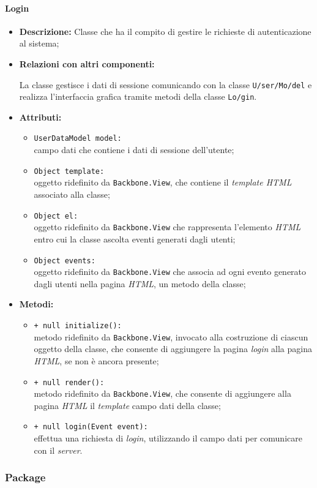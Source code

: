\paragraph{Login}
\label{login}
\begin{flushleft}
\begin{itemize}
\item \textbf{Descrizione:} Classe che ha il compito di gestire le richieste di autenticazione al sistema;
\item \textbf{Relazioni con altri componenti:}
\begin{sloppypar}
La classe gestisce i dati di sessione comunicando con la classe \texttt{\model{}U\fshyp{}ser\fshyp{}Mo\fshyp{}del} e realizza l'interfaccia grafica tramite metodi della classe \texttt{\view{}Lo\fshyp{}gin}.
\end{sloppypar}
\item \textbf{Attributi:}
\begin{sloppypar}
\begin{itemize}
\item \texttt{UserDataModel model:}\\ campo dati che contiene i dati di sessione dell'utente;
\item \texttt{Object template:}\\ oggetto ridefinito da \texttt{Backbone.View}, che contiene il \textit{template HTML} associato alla classe;
\item \texttt{Object el:}\\ oggetto ridefinito da \texttt{Backbone.View} che rappresenta l'elemento \textit{HTML} entro cui la classe ascolta eventi generati dagli utenti;
\item \texttt{Object events:}\\ oggetto ridefinito da \texttt{Backbone.View} che associa ad ogni evento generato dagli utenti nella pagina \textit{HTML}, un metodo della classe;
\end{itemize}
\end{sloppypar}
\item \textbf{Metodi:}
\begin{sloppypar}
\begin{itemize}
\item \texttt{+ null initialize():}\\ metodo ridefinito da \texttt{Backbone.View}, invocato alla costruzione di ciascun oggetto della classe, che consente di aggiungere la pagina \textit{login} alla pagina \textit{HTML}, se non è ancora presente;
\item \texttt{+ null render():}\\ metodo ridefinito da \texttt{Backbone.View}, che consente di aggiungere alla pagina \textit{HTML} il \textit{template} campo dati della classe;
\item \texttt{+ null login(Event event):}\\ effettua una richiesta di \textit{login}, utilizzando il campo dati \model{} per comunicare con il \textit{server}.
\end{itemize}
\end{sloppypar}
\end{itemize}
\end{flushleft}

\subsubsection{Package \logicAdmin{}}


